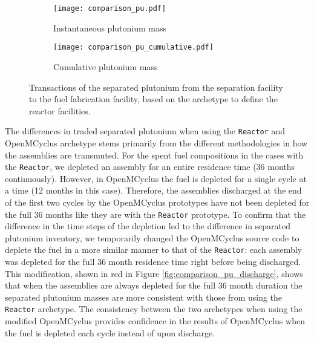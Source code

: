 \begin{figure}[ht!]
    \centering
    \begin{subfigure}[b]{0.48\textwidth}
        \centering
        \texttt{[image: comparison\_pu.pdf]}
        \caption{Instantaneous plutonium mass}
        \label{fig:comparison_pu_inst}
    \end{subfigure}
    \hfill
    \begin{subfigure}[b]{0.48\textwidth}
        \centering
        \texttt{[image: comparison\_pu\_cumulative.pdf]}
        \caption{Cumulative plutonium mass}
        \label{fig:comparison_pu_cumulative}
    \end{subfigure}
       \caption{Transactions of the separated plutonium from the
       separation facility to the fuel fabrication facility, based 
       on the archetype to define the reactor facilities.}
       \label{fig:comparison_pu}
\end{figure}

The differences in traded separated plutonium when using the \Cycamore 
\texttt{Reactor} and OpenMCyclus archetype stems 
primarily from the different methodologies in how the assemblies 
are transmuted. For the spent fuel compositions in the cases with the \Cycamore 
\texttt{Reactor}, we depleted an assembly for an entire residence time 
(36 months continuously). However, in OpenMCyclus the fuel is depleted for 
a single cycle at a time (12 months in this case). Therefore, the 
assemblies discharged at the end of the first two cycles by the 
OpenMCyclus prototypes have not been depleted for the full 36 months 
like they are with the \Cycamore \texttt{Reactor} prototype. To confirm  
that the difference in the time steps of the depletion led to the 
difference in separated plutonium inventory, we temporarily changed
the OpenMCyclus source code to deplete the fuel in a more similar 
manner to that of the \Cycamore \texttt{Reactor}: each assembly was 
depleted for the full 36 month residence time right before being 
discharged. This modification, shown in red in Figure 
\ref{fig:comparison_pu_discharge}, shows that when the assemblies 
are always depleted for the full 36 month duration the 
separated plutonium masses are more consistent with those from 
using the \Cycamore \texttt{Reactor} archetype. The consistency 
between the two archetypes when using the modified OpenMCyclus 
provides confidence in the results of OpenMCyclus when the fuel 
is depleted each cycle instead of upon discharge. 

